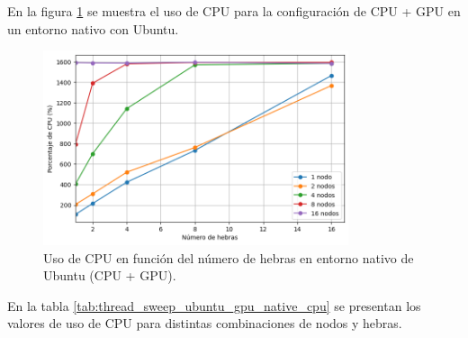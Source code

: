 En la figura \ref{fig:thread_sweep_ubuntu_gpu_native_cpu} se muestra el uso de CPU para la configuración de CPU + GPU en un entorno nativo con Ubuntu.

\begin{figure}[H]
    \centering
    \includegraphics[width=0.8\textwidth]{imagenes/cap5/thread_sweep_ubuntu_gpu_native_cpu.png}
    \caption{Uso de CPU en función del número de hebras en entorno nativo de Ubuntu (CPU + GPU).}
    \label{fig:thread_sweep_ubuntu_gpu_native_cpu}
\end{figure}

En la tabla \ref{tab:thread_sweep_ubuntu_gpu_native_cpu} se presentan los valores de uso de CPU para distintas combinaciones de nodos y hebras.

